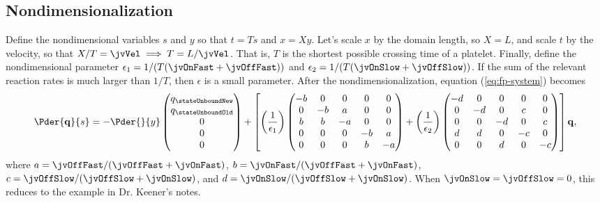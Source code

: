 \subsection{Nondimensionalization}
\label{sec:nondim}

Define the nondimensional variables $s$ and $y$ so that $t = Ts$ and
$x = Xy$. Let's scale $x$ by the domain length, so $X = L$, and scale
$t$ by the velocity, so that $X/T = \jvVel \implies T =
L/\jvVel$. That is, $T$ is the shortest possible crossing time of a
platelet. Finally, define the nondimensional parameter
$\epsilon_1 = 1/(T(\jvOnFast + \jvOffFast))$ and
$\epsilon_2 = 1/(T(\jvOnSlow + \jvOffSlow))$. If the sum of the
relevant reaction rates is much larger than $1/T$, then $\epsilon$
is a small parameter. After the nondimensionalization, equation
(\ref{eq:fp-system}) becomes
\begin{equation}
  \label{eq:nd-system}
  \Pder{\mathbf{q}}{s} = -\Pder{}{y}
  \begin{pmatrix}
    q_{\stateUnboundNew} \\ q_{\stateUnboundOld} \\ 0 \\ 0 \\ 0
  \end{pmatrix}
  + \left[\left(\frac{1}{\epsilon_1}\right) 
  \begin{pmatrix}
    - b & 0 & 0 & 0 & 0 \\
    0 & - b & a & 0 & 0 \\
    b & b & - a & 0 & 0 \\
    0 & 0 & 0 & - b & a \\
    0 & 0 & 0 & b & - a
  \end{pmatrix}
  + \left(\frac{1}{\epsilon_2}\right)
  \begin{pmatrix}
    - d & 0 & 0 & 0 & 0 \\
    0 & - d & 0 & c & 0 \\
    0 & 0 & - d & 0 & c \\
    d & d & 0 & - c & 0 \\
    0 & 0 & d & 0 & - c
  \end{pmatrix}\right]
  \mathbf{q},
\end{equation}
where $a = \jvOffFast/(\jvOffFast + \jvOnFast)$,
$b = \jvOnFast/(\jvOffFast + \jvOnFast)$,
$c = \jvOffSlow/(\jvOffSlow + \jvOnSlow)$, and
$d = \jvOnSlow/(\jvOffSlow + \jvOnSlow)$. When
$\jvOnSlow = \jvOffSlow = 0$, this reduces to the example in
Dr. Keener's notes.

